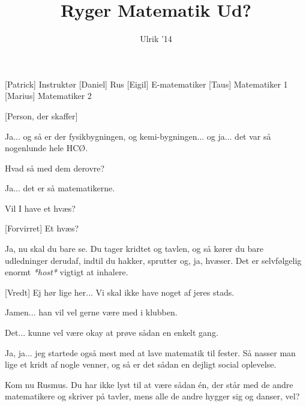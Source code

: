 \documentclass[a4paper,11pt]{article}
\title{Ryger Matematik Ud?}
\author{Ulrik '14}
\begin{document}
\maketitle

\begin{roles}
[Patrick] Instruktør
[Daniel] Rus
[Eigil] E-matematiker
[Taus] Matematiker 1
[Marius] Matematiker 2
\end{roles}

\begin{props}
[Person, der skaffer]
\end{props}

\begin{sketch}


 Ja... og så er der fysikbygningen, og kemi-bygningen... og ja... det var så nogenlunde hele HCØ.


 Hvad så med dem derovre?


 Ja... det er så matematikerne.


 Vil I have et hvæs?

[Forvirret] Et hvæs?

 Ja, nu skal du bare se. Du tager kridtet og tavlen, og så kører du bare udledninger derudaf, indtil du hakker, sprutter og, ja, hvæser. Det er selvfølgelig enormt \textit{*host*} vigtigt at inhalere.

[Vredt] Ej hør lige her... Vi skal ikke have noget af jeres stads.

 Jamen... han vil vel gerne være med i klubben.

 Det... kunne vel være okay at prøve sådan en enkelt gang.

 Ja, ja... jeg startede også mest med at lave matematik til fester. Så nasser man lige et kridt af nogle venner, og så er det sådan en dejligt social oplevelse.

 Kom nu Rusmus. Du har ikke lyst til at være sådan én, der står med de andre matematikere og skriver på tavler, mens alle de andre hygger sig og danser, vel?


\end{sketch}
\end{document}
